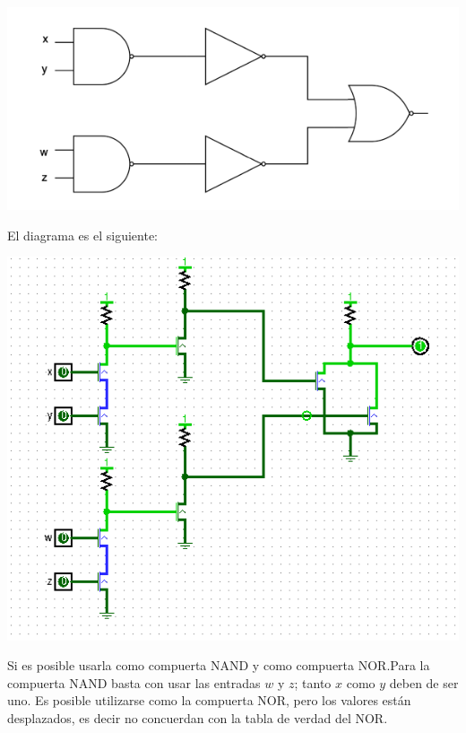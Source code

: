 \documentclass[answers]{exam}
\begin{document}
\begin{questions}
  \begin{center}
    \includegraphics[scale=0.5]{circuito}
  \end{center}
  \begin{solution}
    El diagrama es el siguiente:
    \begin{center}
      \includegraphics[scale=0.8]{ejercicio3}
    \end{center}
  \end{solution}

  \begin{solution}
    Si es posible usarla como compuerta NAND y como compuerta NOR.\@ Para la
    compuerta NAND basta con usar las entradas $w$ y $z$; tanto $x$ como $y$
    deben de ser uno. Es posible utilizarse como la compuerta NOR, pero los
    valores están desplazados, es decir no concuerdan con la tabla de verdad del
    NOR.


\end{solution}
\end{questions}
\end{document}
